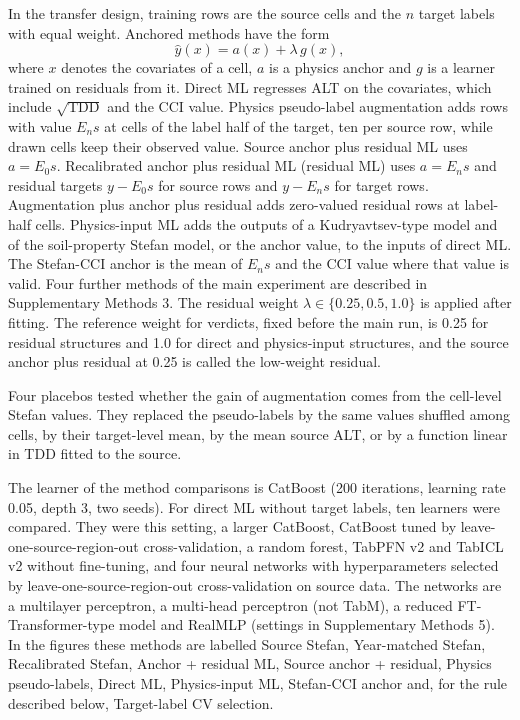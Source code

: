 In the transfer design, training rows are the source cells and the $n$ target labels with equal weight. Anchored methods have the form
\begin{equation}
\hat{y}(x) = a(x) + \lambda\, g(x),
\label{eq:anchor}
\end{equation}
where $x$ denotes the covariates of a cell, $a$ is a physics anchor and $g$ is a learner trained on residuals from it. Direct ML regresses ALT on the covariates, which include $\sqrt{\mathrm{TDD}}$ and the CCI value. Physics pseudo-label augmentation adds rows with value $E_n s$ at cells of the label half of the target, ten per source row, while drawn cells keep their observed value. Source anchor plus residual ML uses $a = E_0 s$. Recalibrated anchor plus residual ML (residual ML) uses $a = E_n s$ and residual targets $y - E_0 s$ for source rows and $y - E_n s$ for target rows. Augmentation plus anchor plus residual adds zero-valued residual rows at label-half cells. Physics-input ML adds the outputs of a Kudryavtsev-type model\cite{Kudryavtsev1974} and of the soil-property Stefan model, or the anchor value, to the inputs of direct ML. The Stefan-CCI anchor is the mean of $E_n s$ and the CCI value where that value is valid. Four further methods of the main experiment are described in Supplementary Methods 3. The residual weight $\lambda \in \{0.25, 0.5, 1.0\}$ is applied after fitting. The reference weight for verdicts, fixed before the main run, is 0.25 for residual structures and 1.0 for direct and physics-input structures, and the source anchor plus residual at 0.25 is called the low-weight residual.

Four placebos tested whether the gain of augmentation comes from the cell-level Stefan values. They replaced the pseudo-labels by the same values shuffled among cells, by their target-level mean, by the mean source ALT, or by a function linear in TDD fitted to the source.

The learner of the method comparisons is CatBoost\cite{Prokhorenkova2018} (200 iterations, learning rate 0.05, depth 3, two seeds). For direct ML without target labels, ten learners were compared. They were this setting, a larger CatBoost, CatBoost tuned by leave-one-source-region-out cross-validation, a random forest, TabPFN v2\cite{Hollmann2025} and TabICL v2\cite{Qu2026} without fine-tuning, and four neural networks with hyperparameters selected by leave-one-source-region-out cross-validation on source data\cite{BergstraBengio2012,CawleyTalbot2010}. The networks are a multilayer perceptron, a multi-head perceptron (not TabM\cite{Gorishniy2025}), a reduced FT-Transformer-type model\cite{Gorishniy2021} and RealMLP\cite{Holzmuller2024} (settings in Supplementary Methods 5). In the figures these methods are labelled Source Stefan, Year-matched Stefan, Recalibrated Stefan, Anchor + residual ML, Source anchor + residual, Physics pseudo-labels, Direct ML, Physics-input ML, Stefan-CCI anchor and, for the rule described below, Target-label CV selection.

